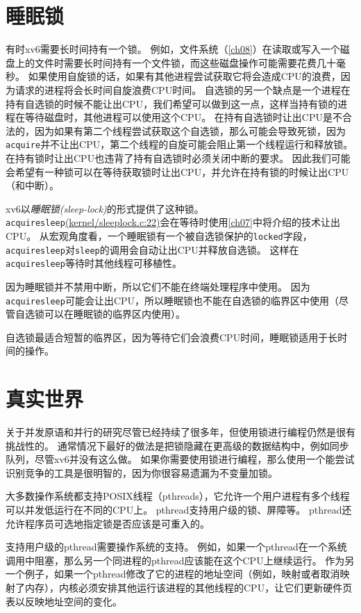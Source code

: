 \section{睡眠锁}
有时xv6需要长时间持有一个锁。
例如，文件系统（\autoref{ch08}）在读取或写入一个磁盘上的文件时需要长时间持有一个文件锁，而这些磁盘操作可能需要花费几十毫秒。
如果使用自旋锁的话，如果有其他进程尝试获取它将会造成CPU的浪费，因为请求的进程将会长时间自旋浪费CPU时间。
自选锁的另一个缺点是一个进程在持有自选锁的时候不能让出CPU，我们希望可以做到这一点，这样当持有锁的进程在等待磁盘时，其他进程可以使用这个CPU。
在持有自选锁时让出CPU是不合法的，因为如果有第二个线程尝试获取这个自选锁，那么可能会导致死锁，因为\texttt{acquire}并不让出CPU，第二个线程的自旋可能会阻止第一个线程运行和释放锁。
在持有锁时让出CPU也违背了持有自选锁时必须关闭中断的要求。
因此我们可能会希望有一种锁可以在等待获取锁时让出CPU，并允许在持有锁的时候让出CPU（和中断）。

xv6以\emph{睡眠锁(sleep-lock)}的形式提供了这种锁。
\texttt{acquiresleep}\href{https://github.com/mit-pdos/xv6-riscv/blob/riscv//kernel/sleeplock.c#L22}{(kernel/sleeplock.c:22)}会在等待时使用\autoref{ch07}中将介绍的技术让出CPU。
从宏观角度看，一个睡眠锁有一个被自选锁保护的\texttt{locked}字段，\texttt{acquiresleep}对\texttt{sleep}的调用会自动让出CPU并释放自选锁。
这样在\texttt{acquiresleep}等待时其他线程可移植性。

因为睡眠锁并不禁用中断，所以它们不能在终端处理程序中使用。
因为\texttt{acquiresleep}可能会让出CPU，所以睡眠锁也不能在自选锁的临界区中使用（尽管自选锁可以在睡眠锁的临界区内使用）。

自选锁最适合短暂的临界区，因为等待它们会浪费CPU时间，睡眠锁适用于长时间的操作。

\section{真实世界}
关于并发原语和并行的研究尽管已经持续了很多年，但使用锁进行编程仍然是很有挑战性的。
通常情况下最好的做法是把锁隐藏在更高级的数据结构中，例如同步队列，尽管xv6并没有这么做。
如果你需要使用锁进行编程，那么使用一个能尝试识别竞争的工具是很明智的，因为你很容易遗漏为不变量加锁。

大多数操作系统都支持POSIX线程（pthreads），它允许一个用户进程有多个线程可以并发低运行在不同的CPU上。
pthread支持用户级的锁、屏障等。
pthread还允许程序员可选地指定锁是否应该是可重入的。

支持用户级的pthread需要操作系统的支持。
例如，如果一个pthread在一个系统调用中阻塞，那么另一个同进程的pthread应该能在这个CPU上继续运行。
作为另一个例子，如果一个pthread修改了它的进程的地址空间（例如，映射或者取消映射了内存），内核必须安排其他运行该进程的其他线程的CPU，让它们更新硬件页表以反映地址空间的变化。

